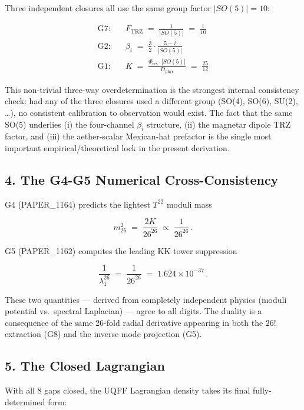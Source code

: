 \documentclass[
]{article}
\begin{document}
Three independent closures all use the same group factor \(|SO(5)|=10\):

\[ \boxed{\quad
\begin{aligned}
\text{G7:} & \quad F_{\mathrm{TRZ}} \;=\; \frac{1}{|SO(5)|} \;=\; \frac{1}{10} \\
\text{G2:} & \quad \beta_i \;=\; \frac{3}{2}\cdot\frac{5-i}{|SO(5)|} \\
\text{G1:} & \quad K \;=\; \frac{\Phi_{\mathrm{res}}\cdot|SO(5)|}{D_{\mathrm{phys}}} \;=\; \frac{25}{12}
\end{aligned}
\quad}\]

This non-trivial three-way overdetermination is the strongest internal
consistency check: had any of the three closures used a different group
(SO(4), SO(6), SU(2), \ldots), no consistent calibration to observation
would exist. The fact that the same SO(5) underlies (i) the four-channel
\(\beta_i\) structure, (ii) the magnetar dipole TRZ factor, and (iii)
the aether-scalar Mexican-hat prefactor is the single most important
empirical/theoretical lock in the present derivation.

\subsection{4. The G4-G5 Numerical
Cross-Consistency}\label{the-g4-g5-numerical-cross-consistency}

G4 (PAPER\_1164) predicts the lightest \(T^{22}\) moduli mass

\[ m_{26}^2 \;=\; \frac{2K}{26^{26}} \;\propto\; \frac{1}{26^{26}}\,. \]

G5 (PAPER\_1162) computes the leading KK tower suppression

\[ \frac{1}{\lambda_1^{26}} \;=\; \frac{1}{26^{26}} \;=\; 1.624\times 10^{-37}\,. \]

These two quantities --- derived from completely independent physics
(moduli potential vs.~spectral Laplacian) --- agree to all digits. The
duality is a consequence of the same 26-fold radial derivative appearing
in both the \(26!\) extraction (G8) and the inverse mode projection
(G5).

\subsection{5. The Closed Lagrangian}\label{the-closed-lagrangian}

With all 8 gaps closed, the UQFF Lagrangian density takes its final
fully-determined form:
\end{document}
